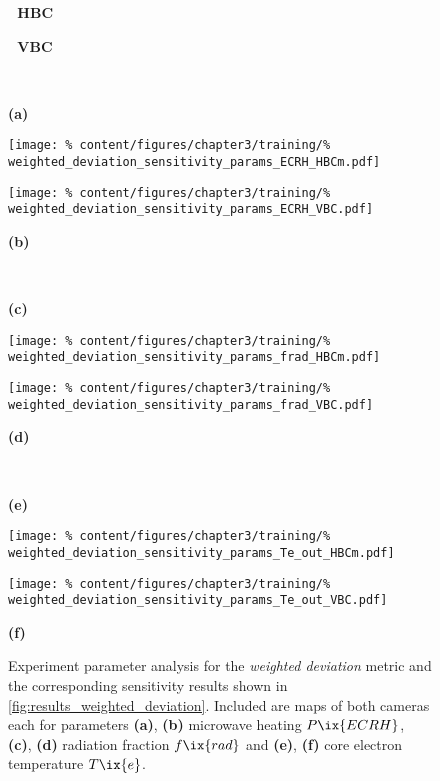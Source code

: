             \begin{figure}[t]%
                \parbox{0.44\linewidth}{%
                    \centering\,\,\,\,\textbf{HBC}}%
                \quad%
                \parbox{0.44\linewidth}{%
                    \centering\,\,\,\,\textbf{VBC}}%
                \,\vspace*{0.2cm}\\%
                \parbox{0.02\linewidth}{%
                    \textbf{(a)}}%
                \quad%
                \parbox{0.42\linewidth}{%
                    \texttt{[image: \%
                        content/figures/chapter3/training/\%
                        weighted\_deviation\_sensitivity\_params\_ECRH\_HBCm.pdf]}}%
                \quad%
                \parbox{0.42\linewidth}{%
                    \texttt{[image: \%
                        content/figures/chapter3/training/\%
                        weighted\_deviation\_sensitivity\_params\_ECRH\_VBC.pdf]}}%
                \quad%
                \parbox{0.02\linewidth}{%
                    \textbf{(b)}}%
                \,\\%
                \parbox{0.02\linewidth}{%
                    \textbf{(c)}}%
                \quad%
                \parbox{0.42\linewidth}{%
                    \texttt{[image: \%
                        content/figures/chapter3/training/\%
                        weighted\_deviation\_sensitivity\_params\_frad\_HBCm.pdf]}}%
                \quad%
                \parbox{0.42\linewidth}{%
                    \texttt{[image: \%
                        content/figures/chapter3/training/\%
                        weighted\_deviation\_sensitivity\_params\_frad\_VBC.pdf]}}%
                \quad%
                \parbox{0.02\linewidth}{%
                    \textbf{(d)}}%
                \,\\%
                \parbox{0.02\linewidth}{%
                    \textbf{(e)}}%
                \quad%
                \parbox{0.42\linewidth}{%
                    \texttt{[image: \%
                        content/figures/chapter3/training/\%
                        weighted\_deviation\_sensitivity\_params\_Te\_out\_HBCm.pdf]}}%
                \quad%
                \parbox{0.42\linewidth}{%
                    \texttt{[image: \%
                        content/figures/chapter3/training/\%
                        weighted\_deviation\_sensitivity\_params\_Te\_out\_VBC.pdf]}}%
                \quad%
                \parbox{0.02\linewidth}{%
                    \textbf{(f)}}%
                \caption{Experiment parameter analysis for the \textit{weighted deviation} metric and the corresponding sensitivity results shown in \cref{fig:results_weighted_deviation}. Included are maps of both cameras each for parameters \textbf{(a)}, \textbf{(b)} microwave heating $P\ix{ECRH}$, \textbf{(c)}, \textbf{(d)} radiation fraction $f\ix{rad}$ and \textbf{(e)}, \textbf{(f)} core electron temperature $T\ix{e}$.%
                }\label{fig:training_parameters}%
            \end{figure}%
